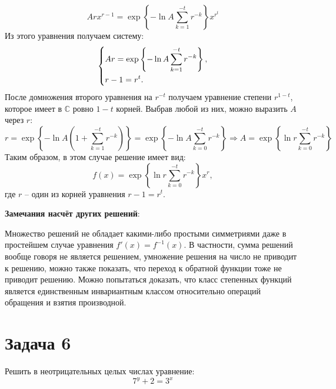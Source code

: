 \documentclass[11pt]{article}
\def\zall{\setcounter{lem}{0}\setcounter{cnsqnc}{0}\setcounter{th}{0}\setcounter{Cmt}{0}\setcounter{equation}{0}}
\newcounter{lem}\setcounter{lem}{0}
\newcounter{th}\setcounter{th}{0}
\newcounter{cnsqnc}\setcounter{cnsqnc}{0}
\newcounter{Cmt}\setcounter{Cmt}{0}
\begin{document}
\begin{enumerate}
\begin{equation*}
Arx^{r - 1} = \exp\left\{-\ln A\sum_{k = 1}^{-t}r^{-k}\right\}x^{r^t}
\end{equation*}
Из этого уравнения получаем систему:
\begin{equation*}
\begin{dcases}
Ar = \exp\left\{-\ln A\sum_{k = 1}^{-t}r^{-k}\right\}, \\
r - 1 = r^t.
\end{dcases}
\end{equation*}
После домножения второго уравнения на $r^{-t}$ получаем уравнение степени $r^{1 - t}$, которое имеет в $\mathbb{C}$ ровно $1 - t$ корней. Выбрав любой из них, можно выразить $A$ через $r$:
\begin{equation*}
r = \exp\left\{-\ln A\left(1 + \sum_{k = 1}^{-t}r^{-k}\right)\right\} = \exp\left\{-\ln A\sum_{k = 0}^{-t}r^{-k}\right\} \Rightarrow A = \exp\left\{\ln r\sum_{k = 0}^{-t}r^{-k}\right\}
\end{equation*}
Таким образом, в этом случае решение имеет вид:
\begin{equation*}
f(x) = \exp\left\{\ln r\sum_{k = 0}^{-t}r^{-k}\right\}x^r,
\end{equation*}
где $r$ -- один из корней уравнения $r - 1 = r^t$.
\end{enumerate}

\textbf{Замечания насчёт других решений}:

Множество решений не обладает какими-либо простыми симметриями даже в простейшем случае уравнения $f'(x) = f^{-1}(x)$. В частности, сумма решений вообще говоря не является решением, умножение решения на число не приводит к решению, можно также показать, что переход к обратной функции тоже не приводит решению. Можно попытаться доказать, что класс степенных функций является единственным инвариантным классом относительно операций обращения и взятия производной.

\pagebreak
\section{Задача 6}
\label{sec:org42dadd6}
\zall
Решить в неотрицательных целых числах уравнение:
\begin{equation}\label{eq:eq6}
7^y + 2 = 3^x
\end{equation}
\end{document}
